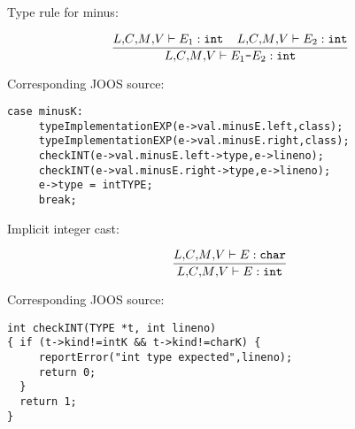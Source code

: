 \begin{slide*} 
Type rule for minus:

$$ \frac{\lib{},\!\class{},\!\method{},\!\vars{} \vdash E_1: \mbox{\tt int}\;\;\;\;
         \lib{},\!\class{},\!\method{},\!\vars{} \vdash E_2: \mbox{\tt int}}{
         \lib{},\!\class{},\!\method{},\!\vars{} \vdash E_1 \mbox{\tt -} E_2: \mbox{\tt int}} $$

Corresponding JOOS source:
 
\begin{scriptsize}
\begin{verbatim}
case minusK:
     typeImplementationEXP(e->val.minusE.left,class);
     typeImplementationEXP(e->val.minusE.right,class);
     checkINT(e->val.minusE.left->type,e->lineno);
     checkINT(e->val.minusE.right->type,e->lineno);
     e->type = intTYPE;
     break;
\end{verbatim}
\end{scriptsize}

Implicit integer cast:

$$ \frac{\mbox{$L$}{},\!\mbox{$C$}{},\!\mbox{$M$}{},\!\mbox{$V$}{} \vdash E: \mbox{\tt char}}{
         \mbox{$L$}{},\!\mbox{$C$}{},\!\mbox{$M$}{},\!\mbox{$V$}{} \vdash E: \mbox{\tt int}} $$

Corresponding JOOS source:

\begin{scriptsize}
\begin{verbatim}
int checkINT(TYPE *t, int lineno)
{ if (t->kind!=intK && t->kind!=charK) {
     reportError("int type expected",lineno);
     return 0;
  }
  return 1;
}
\end{verbatim}
\end{scriptsize}

\vfil
\end{slide*}
 

